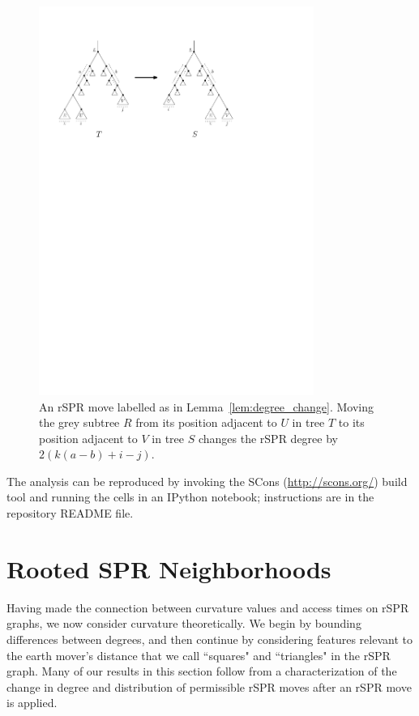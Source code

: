 \documentclass[10pt,twoside,leqno,twocolumn]{article}
\let\MYoriglatexcaption\caption
\renewcommand{\caption}[2][\relax]{\MYoriglatexcaption[#2]{#2}}
\begin{document}
\begin{figure}
	\includegraphics[width=0.8\textwidth]{figs/spr-degree-change}
	\caption{An rSPR move labelled as in Lemma~\ref{lem:degree_change}.
Moving the grey subtree $R$ from its position adjacent to $U$ in tree $T$ to its position adjacent to $V$ in tree $S$ changes the rSPR degree by $2\left(k(a-b) + i - j\right)$.}
	\label{fig:spr-degree-change}
\end{figure}


The analysis can be reproduced by invoking the SCons (\url{http://scons.org/}) build tool and running the cells in an IPython notebook; instructions are in the repository README file.


\section{Rooted SPR Neighborhoods}
\label{sec:neighborhoods}
Having made the connection between curvature values and access times on rSPR graphs, we now consider curvature theoretically.
We begin by bounding differences between degrees, and then continue by considering features relevant to the earth mover's distance that we call ``squares" and ``triangles" in the rSPR graph.
Many of our results in this section follow from a characterization of the change in degree and distribution of permissible rSPR moves after an rSPR move is applied.
\end{document}
